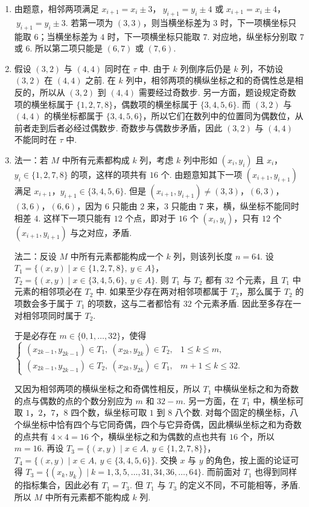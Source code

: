 \begin{solution}
\begin{enumerate}
\item 由题意，相邻两项满足
\(x_{i+1}=x_i\pm 3\)，\(\ y_{i+1}=y_i\pm 4\) 或 \(x_{i+1}=x_i\pm 4\)，\(\ y_{i+1}=y_i\pm 3\).
若第一项为 \((3,3)\)，则当横坐标差为 \(3\) 时，下一项横坐标只能取 \(6\)；当横坐标差为 \(4\) 时，下一项横坐标只能取 \(7\). 对应地，纵坐标分别取 \(7\) 或 \(6\). 所以第二项只能是
\((6,7)\) 或 \((7,6)\).

\item 假设 \((3,2)\) 与 \((4,4)\) 同时在 \(\tau\) 中. 由于 \(k\) 列倒序后仍是 \(k\) 列，不妨设 \((3,2)\) 在 \((4,4)\) 之前. 在 \(k\) 列中，相邻两项的横纵坐标之和的奇偶性总是相反的，所以从 \((3,2)\) 到 \((4,4)\) 需要经过奇数步. 另一方面，题设规定奇数项的横坐标属于 \(\{1,2,7,8\}\)，偶数项的横坐标属于 \(\{3,4,5,6\}\). 而 \((3,2)\) 与 \((4,4)\) 的横坐标都属于 \(\{3,4,5,6\}\)，所以它们在数列中的位置同为偶数位，从前者走到后者必经过偶数步. 奇数步与偶数步矛盾，因此 \((3,2)\) 与 \((4,4)\) 不能同时在 \(\tau\) 中.

\item 法一：若 \(M\) 中所有元素都构成 \(k\) 列，考虑 \(k\) 列中形如 \((x_i,y_i)\) 且 \(x_i\)，\(y_i\in\{1,2,7,8\}\) 的项，这样的项共有 \(16\) 个. 由题意知其下一项 \((x_{i+1},y_{i+1})\) 满足 \(x_{i+1}\)，\(y_{i+1}\in\{3,4,5,6\}\). 但是 \((x_{i+1},y_{i+1})\ne (3,3)\)，\((6,3)\)，\((3,6)\)，\((6,6)\)，因为 \(6\) 只能由 \(2\) 来，\(3\) 只能由 \(7\) 来，横，纵坐标不能同时相差 \(4\). 这样下一项只能有 \(12\) 个点，即对于 \(16\) 个 \((x_i,y_i)\)，只有 \(12\) 个 \((x_{i+1},y_{i+1})\) 与之对应，矛盾.

法二：反设 \(M\) 中所有元素都能构成一个 \(k\) 列，则该列长度 \(n=64\). 设 \(T_1=\{(x,y)\mid x\in\{1,2,7,8\},\ y\in A\}\)，\(T_2=\{(x,y)\mid x\in\{3,4,5,6\},\ y\in A\}\). 则 \(T_1\) 与 \(T_2\) 都有 \(32\) 个元素，且 \(T_1\) 中元素的相邻项必在 \(T_2\) 中. 如果至少存在两对相邻项都属于 \(T_2\)，那么属于 \(T_2\) 的项数会多于属于 \(T_1\) 的项数，这与二者都恰有 \(32\) 个元素矛盾. 因此至多存在一对相邻项同时属于 \(T_2\).

于是必存在 \(m\in\{0,1,\dots,32\}\)，使得
\(
\begin{cases}
(x_{2k-1},y_{2k-1})\in T_1,\ (x_{2k},y_{2k})\in T_2,& 1\le k\le m,\\
(x_{2k-1},y_{2k-1})\in T_2,\ (x_{2k},y_{2k})\in T_1,& m+1\le k\le 32.
\end{cases}
\)

又因为相邻两项的横纵坐标之和奇偶性相反，所以 \(T_1\) 中横纵坐标之和为奇数的点与偶数的点的个数分别应为 \(m\) 和 \(32-m\). 另一方面，在 \(T_1\) 中，横坐标可取 \(1\)，\(2\)，\(7\)，\(8\) 四个数，纵坐标可取 \(1\) 到 \(8\) 八个数. 对每个固定的横坐标，八个纵坐标中恰有四个与它同奇偶，四个与它异奇偶，因此横纵坐标之和为奇数的点共有 \(4\times 4=16\) 个，横纵坐标之和为偶数的点也共有 \(16\) 个，所以 \(m=16\). 再设
\(T_3=\{(x,y)\mid x\in A,\ y\in\{1,2,7,8\}\}\)，\(T_4=\{(x,y)\mid x\in A,\ y\in\{3,4,5,6\}\}\). 交换 \(x\) 与 \(y\) 的角色，按上面的论证可得 \(T_3=\{(x_k,y_k)\mid k=1,3,5,\dots,31,34,36,\dots,64\}\). 而前面对 \(T_1\) 也得到同样的指标集合，因此必有 \(T_1=T_3\). 但 \(T_1\) 与 \(T_3\) 的定义不同，不可能相等，矛盾. 所以 \(M\) 中所有元素都不能构成 \(k\) 列.
\end{enumerate}
\end{solution}
